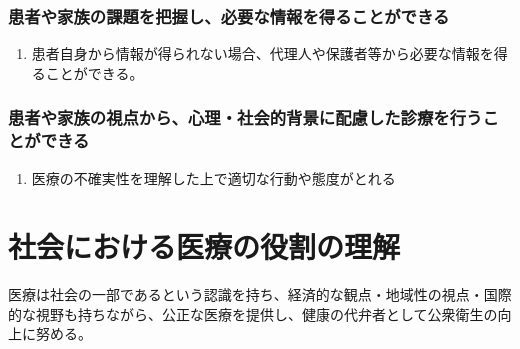 \documentclass[
]{ltjsarticle}
\providecommand{\tightlist}{%
  \setlength{\itemsep}{0pt}\setlength{\parskip}{0pt}}
\begin{document}
\hypertarget{ux60a3ux8005ux3084ux5bb6ux65cfux306eux8ab2ux984cux3092ux628aux63e1ux3057ux5fc5ux8981ux306aux60c5ux5831ux3092ux5f97ux308bux3053ux3068ux304cux3067ux304dux308b}{%
\subsubsection{患者や家族の課題を把握し、必要な情報を得ることができる}\label{ux60a3ux8005ux3084ux5bb6ux65cfux306eux8ab2ux984cux3092ux628aux63e1ux3057ux5fc5ux8981ux306aux60c5ux5831ux3092ux5f97ux308bux3053ux3068ux304cux3067ux304dux308b}}

\begin{enumerate}
\def\labelenumi{\arabic{enumi}.}
\tightlist
\item
  患者自身から情報が得られない場合、代理人や保護者等から必要な情報を得ることができる。
\end{enumerate}

\hypertarget{ux60a3ux8005ux3084ux5bb6ux65cfux306eux8996ux70b9ux304bux3089ux5fc3ux7406ux793eux4f1aux7684ux80ccux666fux306bux914dux616eux3057ux305fux8a3aux7642ux3092ux884cux3046ux3053ux3068ux304cux3067ux304dux308b}{%
\subsubsection{患者や家族の視点から、心理・社会的背景に配慮した診療を行うことができる}\label{ux60a3ux8005ux3084ux5bb6ux65cfux306eux8996ux70b9ux304bux3089ux5fc3ux7406ux793eux4f1aux7684ux80ccux666fux306bux914dux616eux3057ux305fux8a3aux7642ux3092ux884cux3046ux3053ux3068ux304cux3067ux304dux308b}}

\begin{enumerate}
\def\labelenumi{\arabic{enumi}.}
\tightlist
\item
  医療の不確実性を理解した上で適切な行動や態度がとれる
\end{enumerate}

\newpage

\hypertarget{ux793eux4f1aux306bux304aux3051ux308bux533bux7642ux306eux5f79ux5272ux306eux7406ux89e3}{%
\section{社会における医療の役割の理解}\label{ux793eux4f1aux306bux304aux3051ux308bux533bux7642ux306eux5f79ux5272ux306eux7406ux89e3}}

医療は社会の一部であるという認識を持ち、経済的な観点・地域性の視点・国際的な視野も持ちながら、公正な医療を提供し、健康の代弁者として公衆衛生の向上に努める。
\end{document}
